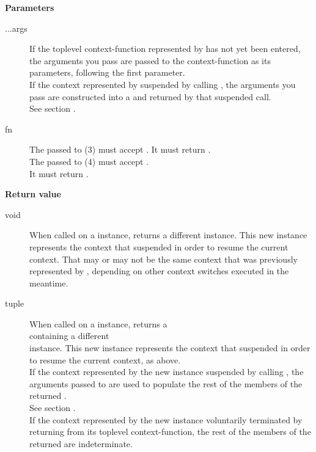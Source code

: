 {\bfseries Parameters}
\begin{description}
    \item[...args] If the toplevel context-function represented
                   by  has not yet been entered, the arguments
                   you pass are passed to the context-function as its
                   parameters, following the \ectx first parameter. \\
                   If the context represented by  suspended by
                   calling \op, the arguments you pass
                   are constructed into a \ectxargstup and returned by
                   that suspended \op call. \\
                   See section .\\
    \item[fn]      The  passed to (3) must accept \ectxargsargs. It
                   must return \ectxargstup.\\
                   The  passed to (4) must accept \ectxvoid.\\
                   It must return \ectxvoid.\\
\end{description}

{\bfseries Return value}
\begin{description}
    \item[void]     When called on a \ectxvoid instance, \op returns
                    a different \ectxvoid instance. This new instance
                    represents the context that suspended in order to resume
                    the current context. That may or may not be the same
                    context that was previously represented by ,
                    depending on other context switches executed in the
                    meantime.
    \item[tuple]    When called on a \ectxargs instance, \op returns a\\
                    \ectxargstup containing a different\\
                    \ectxargs instance. This new instance represents the
                    context that suspended in order to resume the current
                    context, as above.\\
                    If the context represented by the new \ectxargs instance
                    suspended by calling \op, the arguments passed to \op are
                    used to populate the rest of the members of the
                    returned .\\
                    See section .\\
                    If the context represented by the new \ectxargs instance
                    voluntarily terminated by returning from its toplevel
                    context-function, the rest of the members of the
                    returned  are indeterminate.\\
\end{description}

